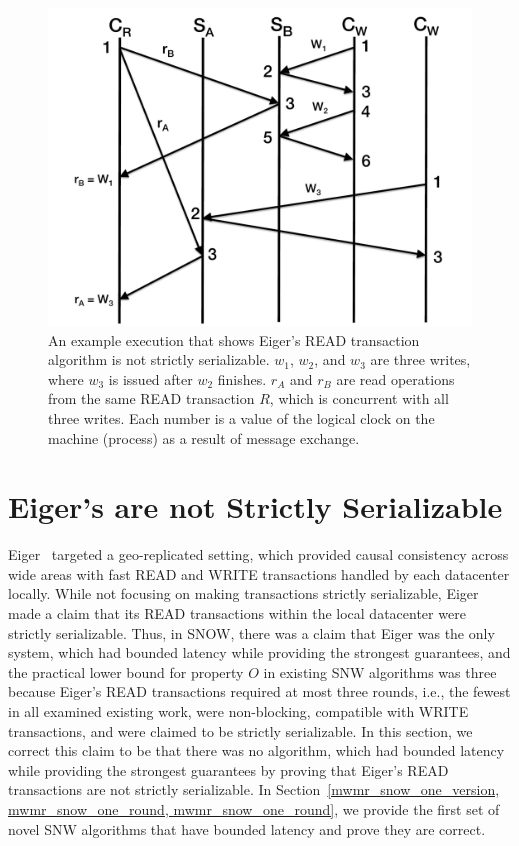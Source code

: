 \begin{figure}[t]
\centering
\includegraphics[width=1.0\columnwidth]{figures/eiger-example-2.pdf}
\caption{An example execution that shows Eiger's \textsc{READ} transaction algorithm is not strictly serializable. $w_1$, $w_2$, and $w_3$ are three writes, where $w_3$ is issued after $w_2$ finishes. $r_A$ and $r_B$ are read operations from the same \textsc{READ} transaction $R$, which is concurrent with all three writes. Each number is a value of the logical clock on the machine (process) as a result of message exchange.}
\label{fig:eigerrot}
\end{figure}


\section{Eiger's \rots{} are not Strictly Serializable}
\label{app:eiger_not_s}
Eiger~\cite{Lloyd:nsdi2013} targeted a geo-replicated setting, which provided causal consistency across wide areas with fast \textsc{READ} and \textsc{WRITE} transactions handled by each datacenter locally. While not focusing on making transactions strictly serializable, Eiger made a claim that its \textsc{READ} transactions within the local datacenter were strictly serializable. Thus, in SNOW, there was a claim that Eiger was the only system, which had bounded latency while providing the strongest guarantees, and the practical lower bound for property $O$ in existing SNW algorithms was three because Eiger's \textsc{READ} transactions required at most three rounds, i.e., the fewest in all examined existing work, were non-blocking, compatible with \textsc{WRITE} transactions, and were claimed to be strictly serializable. In this section, we correct this claim to be that there was no algorithm, which had bounded latency while providing the strongest guarantees by proving that Eiger's \textsc{READ} transactions are not strictly serializable. In Section~\ref{mwmr_snow_one_version, mwmr_snow_one_round, mwmr_snow_one_round}, we provide the first set of novel SNW algorithms that have bounded latency and prove they are correct.

